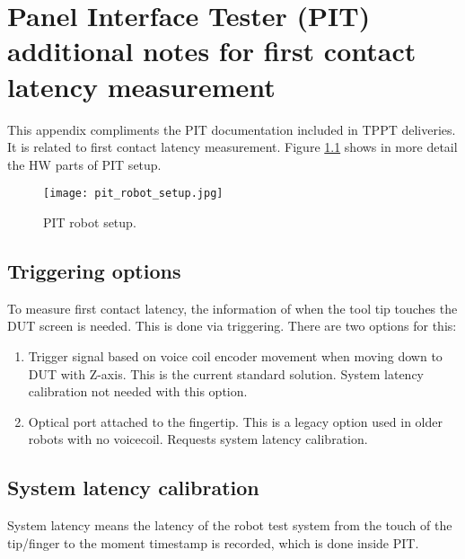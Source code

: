 \chapter{Panel Interface Tester (PIT) additional notes for first contact latency measurement}
This appendix compliments the PIT documentation included in TPPT deliveries. It is related to first contact latency measurement. Figure \ref{fig:pit_robot_setup} shows in more detail the HW parts of PIT setup.

\begin{figure}[!h]
	\centering
	\texttt{[image: pit\_robot\_setup.jpg]}
	\caption{PIT robot setup.}
	\label{fig:pit_robot_setup}
\end{figure}

\section{Triggering options}
To measure first contact latency, the information of when the tool tip touches the DUT screen is needed. This is done via triggering. There are two options for this:
\begin{enumerate}
	\item Trigger signal based on voice coil encoder movement when moving down to DUT with Z-axis. This is the current standard solution. System latency calibration not needed with this option.
	\item Optical port attached to the fingertip. This is a legacy option used in older robots with no voicecoil. Requests system latency calibration.
\end{enumerate}


\section{System latency calibration}

System latency means the latency of the robot test system from the touch of the tip/finger to the moment timestamp is recorded, which is done inside PIT.

